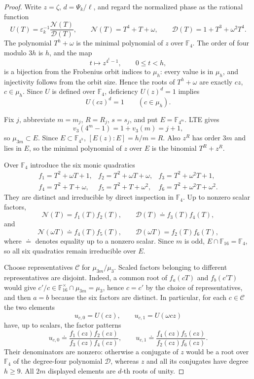 \documentclass[11pt]{article}
\theoremstyle{definition}
\theoremstyle{remark}
\begin{document}
\begin{proof}
Write $z=\zeta$, $d=\Psi_k/\ell$, and regard the normalized phase as the
rational function
\[
 U(T)=\varepsilon_k^{-1}\frac{\mathcal N(T)}{\mathcal D(T)},
 \qquad
 \mathcal N(T)=T^4+T+\omega,
 \qquad
 \mathcal D(T)=1+T^3+\omega^2T^4.
\]
The polynomial $T^h+\omega$ is the minimal polynomial of $z$ over
$\mathbb F_4$.  The order of four modulo $3h$ is $h$, and the map
\[
 t\longmapsto z^{4^t-1},\qquad 0\leq t<h,
\]
is a bijection from the Frobenius orbit indices to $\mu_h$: every value is
in $\mu_h$, and injectivity follows from the orbit size.  Hence the roots of
$T^h+\omega$ are exactly $cz$, $c\in\mu_h$.  Since $U$ is defined over
$\mathbb F_4$, deficiency $U(z)^d=1$ implies
\[
 U(cz)^d=1\qquad(c\in\mu_h).
\]

Fix $j$, abbreviate $m=m_j$, $R=R_j$, $s=s_j$, and put
$E=\mathbb F_{4^m}$.  LTE gives
\[
 v_3(4^m-1)=1+v_3(m)=j+1,
\]
so $\mu_{3m}\subset E$.  Since $E\subset\mathbb F_{4^h}$,
$[E(z):E]=h/m=R$.  Also $z^R$ has order $3m$ and lies in $E$, so the
minimal polynomial of $z$ over $E$ is the binomial $T^R+z^R$.

Over $\mathbb F_4$ introduce the six monic quadratics
\[
\begin{array}{lll}
 f_1=T^2+\omega T+1,
 &f_2=T^2+\omega T+\omega,
 &f_3=T^2+\omega^2T+1,\\
 f_4=T^2+T+\omega,
 &f_5=T^2+T+\omega^2,
 &f_6=T^2+\omega^2T+\omega^2.
\end{array}
\]
They are distinct and irreducible by direct inspection in $\mathbb F_4$.
Up to nonzero scalar factors,
\[
 \mathcal N(T)=f_1(T)f_2(T),\qquad
 \mathcal D(T)\doteq f_3(T)f_4(T),
\]
and
\[
 \mathcal N(\omega T)\doteq f_4(T)f_5(T),\qquad
 \mathcal D(\omega T)=f_2(T)f_6(T),
\]
where $\doteq$ denotes equality up to a nonzero scalar.  Since $m$ is odd,
$E\cap\mathbb F_{16}=\mathbb F_4$, so all six quadratics remain irreducible
over $E$.

Choose representatives $\mathcal C$ for $\mu_{3m}/\mu_3$.  Scaled factors
belonging to different representatives are disjoint.  Indeed, a common root
of $f_a(cT)$ and $f_b(c'T)$ would give
$c'/c\in\mathbb F_{16}^{\times}\cap\mu_{3m}=\mu_3$, hence $c=c'$ by the
choice of representatives, and then $a=b$ because the six factors are
distinct.  In particular, for each $c\in\mathcal C$ the two elements
\[
 u_{c,0}=U(cz),\qquad u_{c,1}=U(\omega cz)
\]
have, up to scalars, the factor patterns
\[
 u_{c,0}\doteq\frac{f_1(cz)f_2(cz)}{f_3(cz)f_4(cz)},
 \qquad
 u_{c,1}\doteq\frac{f_4(cz)f_5(cz)}{f_2(cz)f_6(cz)}.
\]
Their denominators are nonzero: otherwise a conjugate of $z$ would be a
root over $\mathbb F_4$ of the degree-four polynomial $\mathcal D$, whereas
$z$ and all its conjugates have degree $h\geq9$.  All $2m$ displayed
elements are $d$-th roots of unity.


\end{proof}
\end{document}
